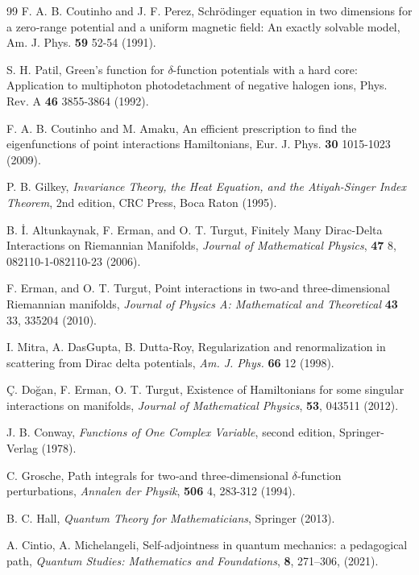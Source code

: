 \documentclass[amsmath,amssymb,14pt]{article}
\numberwithin{equation}{section}
\begin{document}
\begin{thebibliography}{99}
 F. A. B. Coutinho and J. F. Perez, Schr\"{o}dinger equation in two dimensions for a zero‐range potential and a uniform magnetic field: 
An exactly solvable model, Am. J. Phys. \textbf{59} 52-54 (1991).

  S. H. Patil, Green’s function for $\delta$-function potentials with a hard core: Application to multiphoton photodetachment of negative halogen ions, Phys. Rev. A \textbf{46} 3855-3864 (1992).

 F. A. B. Coutinho and M. Amaku, 
An efficient prescription to find the eigenfunctions of point interactions Hamiltonians, Eur. J. Phys. \textbf{30} 1015-1023 (2009).

 P. B. Gilkey, \textit{Invariance Theory, the Heat Equation, and the Atiyah-Singer Index
Theorem}, 2nd edition, CRC Press, Boca Raton (1995).


 B. \.{I}. Altunkaynak, F. Erman, and O. T. Turgut, Finitely Many Dirac-Delta Interactions
on Riemannian Manifolds, \textit{Journal of Mathematical
Physics}, \textbf{47} 8, 082110-1-082110-23 (2006).

 F. Erman, and O. T. Turgut, Point interactions in two-and three-dimensional Riemannian manifolds, \textit{Journal of Physics A: Mathematical and Theoretical} \textbf{43} 33, 335204 (2010).

 I. Mitra, A. DasGupta, B. Dutta-Roy, Regularization and renormalization in scattering from Dirac delta potentials, \textit{Am. J. Phys.} \textbf{66} 12 (1998).

 \c{C}. Do\u{g}an, F. Erman, O. T. Turgut, Existence of Hamiltonians for some singular interactions on manifolds, \textit{Journal of Mathematical Physics}, \textbf{53}, 043511 (2012).


 J. B. Conway, \textit{Functions of One Complex Variable}, second edition, Springer-Verlag (1978).

 C. Grosche, Path integrals for two‐and three‐dimensional $\delta$‐function perturbations, \textit{Annalen der Physik}, \textbf{506} 4, 283-312 (1994).


 B. C. Hall, \textit{Quantum Theory for Mathematicians}, Springer (2013).

 A. Cintio, A. Michelangeli, Self-adjointness in quantum mechanics: a pedagogical path,  \textit{Quantum Studies: Mathematics and Foundations}, \textbf{8}, 271–306, (2021).

\end{thebibliography}
\end{document}
